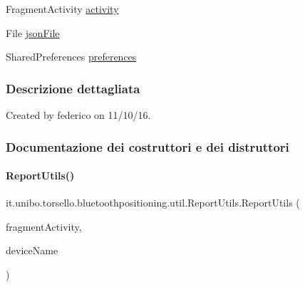 \begin{DoxyCompactItemize}
\item 
Fragment\+Activity \hyperlink{classit_1_1unibo_1_1torsello_1_1bluetoothpositioning_1_1util_1_1ReportUtils_ae36eb3321f2d7f96753d7854f5cb6923_ae36eb3321f2d7f96753d7854f5cb6923}{activity}
\item 
File \hyperlink{classit_1_1unibo_1_1torsello_1_1bluetoothpositioning_1_1util_1_1ReportUtils_a3d54acab8d9785425b61d7a294444f85_a3d54acab8d9785425b61d7a294444f85}{json\+File}
\item 
Shared\+Preferences \hyperlink{classit_1_1unibo_1_1torsello_1_1bluetoothpositioning_1_1util_1_1ReportUtils_af1f57227f8c42073b4f8f2b65e86ebd7_af1f57227f8c42073b4f8f2b65e86ebd7}{preferences}
\end{DoxyCompactItemize}


\subsubsection{Descrizione dettagliata}
Created by federico on 11/10/16. 

\subsubsection{Documentazione dei costruttori e dei distruttori}
\hypertarget{classit_1_1unibo_1_1torsello_1_1bluetoothpositioning_1_1util_1_1ReportUtils_af9975aaf0a16c6a51afd258b8c3f77c0_af9975aaf0a16c6a51afd258b8c3f77c0}{}\label{classit_1_1unibo_1_1torsello_1_1bluetoothpositioning_1_1util_1_1ReportUtils_af9975aaf0a16c6a51afd258b8c3f77c0_af9975aaf0a16c6a51afd258b8c3f77c0} 
\paragraph{\texorpdfstring{Report\+Utils()}{ReportUtils()}}
{\footnotesize\ttfamily it.\+unibo.\+torsello.\+bluetoothpositioning.\+util.\+Report\+Utils.\+Report\+Utils (\begin{DoxyParamCaption}\item[{Fragment\+Activity}]{fragment\+Activity,  }\item[{String}]{device\+Name }\end{DoxyParamCaption})}


